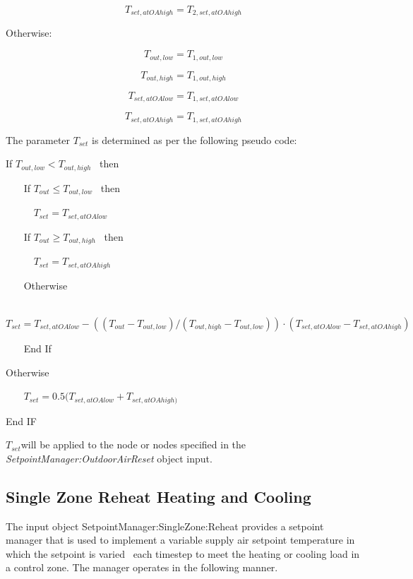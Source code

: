 \begin{equation}
{T_{set,atOAhigh}} = {T_{2,set,atOAhigh}}
\end{equation}

Otherwise:

\begin{equation}
{T_{out,low}} = {T_{1,out,low}}
\end{equation}

\begin{equation}
{T_{out,high}} = {T_{1,out,high}}
\end{equation}

\begin{equation}
{T_{set,atOAlow}} = {T_{1,set,atOAlow}}
\end{equation}

\begin{equation}
{T_{set,atOAhigh}} = {T_{1,set,atOAhigh}}
\end{equation}

The parameter \(T_{set}\) is determined as per the following pseudo code:
 
If \({T_{out,low}} < {T_{out,high}}\) ~then

~~~ If \({T_{out}} \le {T_{out,low}}\) ~then

~~~~~ \({T_{set}} = {T_{set,atOAlow}}\)

~~~ If \({T_{out}} \ge {T_{out,high}}\) ~then

~~~~~ \({T_{set}} = {T_{set,atOAhigh}}\)

~~~ Otherwise

~~~~~ \({T_{set}} = {T_{set,atOAlow}} - (({T_{out}} - {T_{out,low}})/({T_{out,high}} - {T_{out,low}}))\cdot ({T_{set,atOAlow}} - {T_{set,atOAhigh}})\)

~~~ End If

Otherwise

~~~ \({T_{set}} = 0.5({T_{set,atOAlow}} + {T_{set,atOAhigh)}}\)

End IF

\emph{\({T_{set}}\)}will be applied to the node or nodes specified in the \emph{SetpointManager:OutdoorAirReset} object input.

\subsection{Single Zone Reheat Heating and Cooling}\label{single-zone-reheat-heating-and-cooling}

The input object SetpointManager:SingleZone:Reheat provides a setpoint manager that is used to implement a variable supply air setpoint temperature in which the setpoint is varied~ each timestep to meet the heating or cooling load in a control zone. The manager operates in the following manner.

